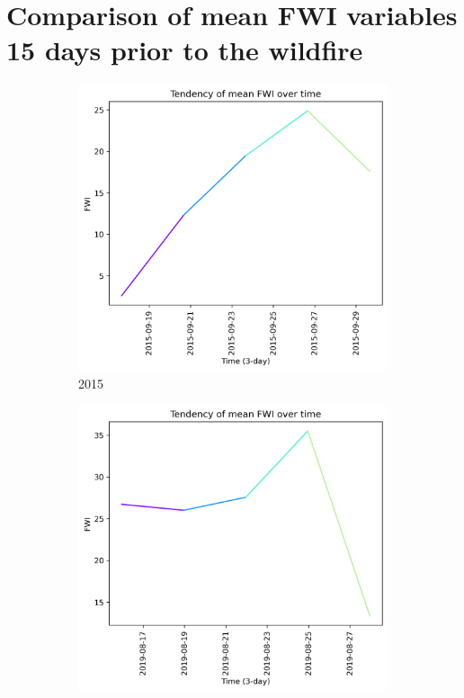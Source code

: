 \FloatBarrier

\section{Comparison of mean FWI variables 15 days prior to the wildfire}

\begin{figure}[h]
    \centering
    \caption{FWI values 15 days prior to wildfire}
    \begin{subfigure}{0.3\textwidth}
        \centering
        \includegraphics[width=\textwidth]{graphs/2015/15daysprior/2015_15daysprior_tendency_graph_FWI.png}
        \caption{2015}
        \label{fig:prior_15_days_2015}
    \end{subfigure}
    \hfill
    \begin{subfigure}{0.3\textwidth}
        \centering
        \includegraphics[width=\textwidth]{graphs/2019/15daysprior/2019_15daysprior_tendency_graph_FWI.png}

\end{subfigure}
\end{figure}

